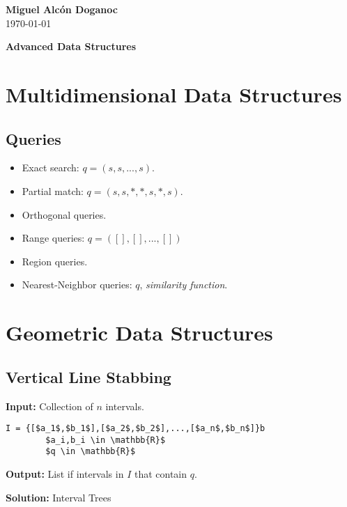 \documentclass[a4paper, 10pt]{article}
\begin{document}
\noindent
\begin{flushright}
    \large\textbf{Miguel Alcón Doganoc} \\
    \today %
\end{flushright}

\noindent
{\huge{\textbf{Advanced Data Structures}}}
\section{Multidimensional Data Structures}
\subsection{Queries}
\begin{itemize}
    \item Exact search: $q=(s,s,...,s)$.
    \item Partial match: $q=(s,s,*,*,s,*,s)$.
    \item Orthogonal queries.
    \item Range queries: $q=([],[],...,[])$
    \item Region queries.
    \item Nearest-Neighbor queries: $q$, \textit{similarity function}.
\end{itemize}

\section{Geometric Data Structures}
\subsection{Vertical Line Stabbing}
\textbf{Input:} Collection of $n$ intervals.
\begin{lstlisting}[mathescape=true]
        I = {[$a_1$,$b_1$],[$a_2$,$b_2$],...,[$a_n$,$b_n$]}b
        $a_i,b_i \in \mathbb{R}$
        $q \in \mathbb{R}$
\end{lstlisting}
\textbf{Output:} List if intervals in $I$ that contain $q$.

\textbf{Solution:} Interval Trees
\end{document}
